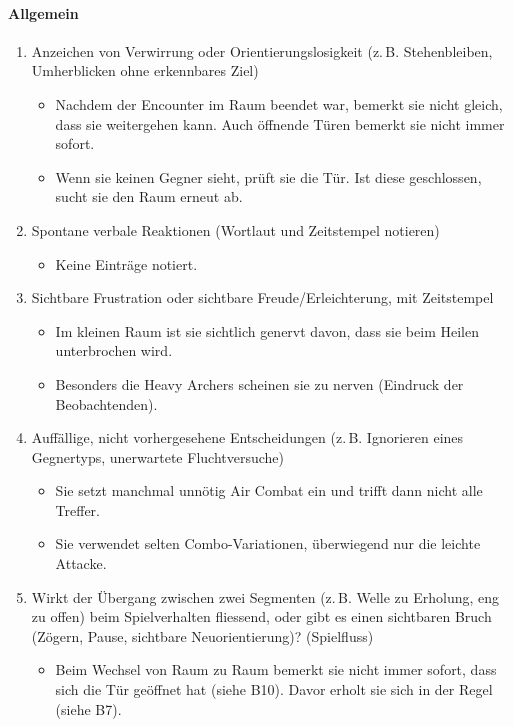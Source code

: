 \documentclass[../Main.tex]{subfiles}
\begin{document}
\paragraph{Allgemein}
\begin{enumerate}[label=\textbf{B\arabic*}, leftmargin=1.5cm, itemsep=0.8em, resume]
    \item Anzeichen von Verwirrung oder Orientierungslosigkeit (z.\,B. Stehenbleiben, Umherblicken ohne erkennbares Ziel)
        \begin{itemize}[nosep]
            \item Nachdem der Encounter im Raum beendet war, bemerkt sie nicht gleich, dass sie weitergehen kann. Auch öffnende Türen bemerkt sie nicht immer sofort.
            \item Wenn sie keinen Gegner sieht, prüft sie die Tür. Ist diese geschlossen, sucht sie den Raum erneut ab.
        \end{itemize}

    \item Spontane verbale Reaktionen (Wortlaut und Zeitstempel notieren)
        \begin{itemize}[nosep]
            \item Keine Einträge notiert.
        \end{itemize}

    \item Sichtbare Frustration oder sichtbare Freude/Erleichterung, mit Zeitstempel
        \begin{itemize}[nosep]
            \item Im kleinen Raum ist sie sichtlich genervt davon, dass sie beim Heilen unterbrochen wird.
            \item Besonders die Heavy Archers scheinen sie zu nerven (Eindruck der Beobachtenden).
        \end{itemize}

    \item Auffällige, nicht vorhergesehene Entscheidungen (z.\,B. Ignorieren eines Gegnertyps, unerwartete Fluchtversuche)
        \begin{itemize}[nosep]
            \item Sie setzt manchmal unnötig Air Combat ein und trifft dann nicht alle Treffer.
            \item Sie verwendet selten Combo-Variationen, überwiegend nur die leichte Attacke.
        \end{itemize}

    \item Wirkt der Übergang zwischen zwei Segmenten (z.\,B. Welle zu Erholung, eng zu offen) beim Spielverhalten fliessend, oder gibt es einen sichtbaren Bruch (Zögern, Pause, sichtbare Neuorientierung)? \hfill (Spielfluss)
        \begin{itemize}[nosep]
            \item Beim Wechsel von Raum zu Raum bemerkt sie nicht immer sofort, dass sich die Tür geöffnet hat (siehe B10). Davor erholt sie sich in der Regel (siehe B7).
        \end{itemize}
\end{enumerate}
\end{document}
